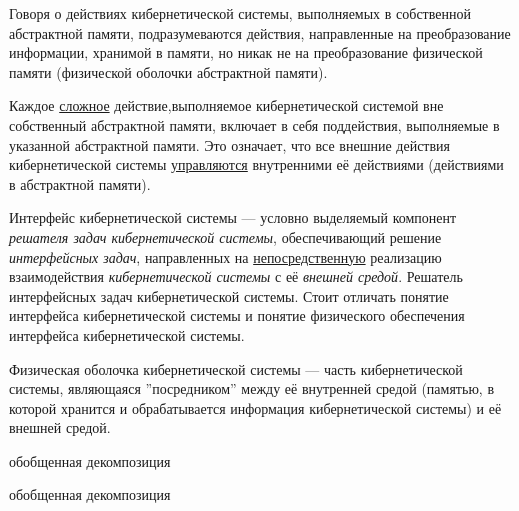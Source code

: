 Говоря о действиях кибернетической системы, выполняемых в собственной абстрактной памяти, подразумеваются действия, направленные на преобразование информации, хранимой в памяти, но никак не на преобразование физической памяти (физической оболочки абстрактной памяти).

Каждое \uline{сложное} действие,выполняемое кибернетической системой вне собственный абстрактной памяти, включает в себя поддействия, выполняемые в указанной абстрактной памяти. 
Это означает, что все внешние действия кибернетической системы \uline{управляются} внутренними её действиями (действиями в абстрактной памяти).


Интерфейс кибернетической системы --- условно выделяемый компонент \textit{решателя задач кибернетической системы}, обеспечивающий решение \textit{интерфейсных задач}, направленных на \uline{непосредственную} реализацию взаимодействия \textit{кибернетической системы} с её \textit{внешней средой}. Решатель интерфейсных задач кибернетической системы. Стоит отличать понятие интерфейса кибернетической системы и понятие физического обеспечения интерфейса кибернетической системы.

Физическая оболочка кибернетической системы --- часть кибернетической системы, являющаяся ''посредником''{} между её внутренней средой (памятью, в которой хранится и обрабатывается информация кибернетической системы) и её внешней средой.

\begin{SCn}
	\begin{scnrelfromset}{обобщенная декомпозиция}
	\end{scnrelfromset}
\end{SCn}


\begin{SCn}
	\begin{scnrelfromset}{обобщенная декомпозиция}
	\end{scnrelfromset}
\end{SCn}

